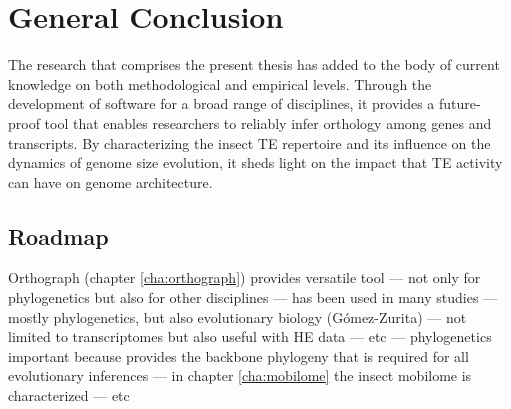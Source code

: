\chapter{General Conclusion}
\label{conclusion}

The research that comprises the present thesis has added to the body of
current knowledge on both methodological and empirical levels. Through
the development of software for a broad range of disciplines, it
provides a future-proof tool that enables researchers to reliably infer
orthology among genes and transcripts. By characterizing the insect TE
repertoire and its influence on the dynamics of genome size evolution,
it sheds light on the impact that TE activity can have on genome
architecture.


\section{Roadmap}

Orthograph (chapter \ref{cha:orthograph}) provides versatile tool ---
not only for phylogenetics but also for other disciplines --- has been
used in many studies --- mostly phylogenetics, but also evolutionary
biology (Gómez-Zurita) --- not limited to transcriptomes but also useful
with HE data --- etc --- phylogenetics important because provides the
backbone phylogeny that is required for all evolutionary inferences ---
in chapter \ref{cha:mobilome} the insect mobilome is characterized ---
etc

